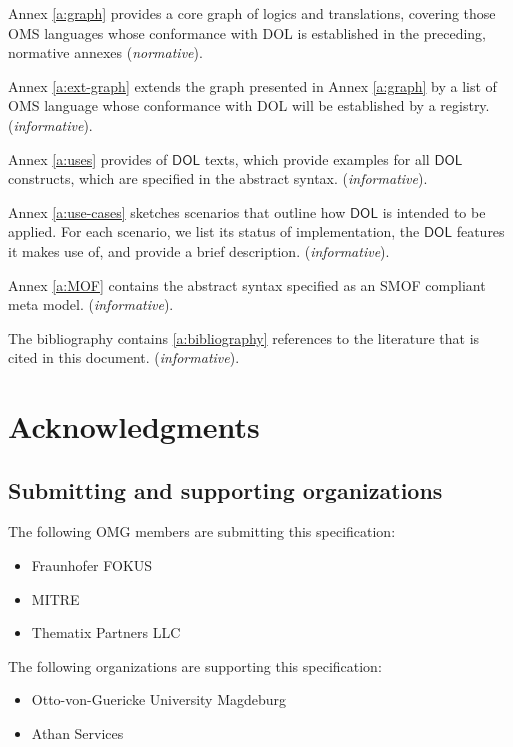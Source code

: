 \documentclass[10pt,fleqn,%
\ifpretendfinal
final%
\else
draft%
\fi,
]{scrreprt}
\newcommand*{\DOL}{\ensuremath{\mathsf{DOL}}\xspace}
\begin{document}
\medskip \noindent 
Annex \ref{a:graph}  provides a core graph of logics and translations, covering those OMS languages
whose conformance with DOL is established in the preceding, normative annexes (\emph{normative}). 

\medskip \noindent 
Annex \ref{a:ext-graph} extends the graph presented in Annex \ref{a:graph}  by a list of OMS
language whose conformance with DOL will be established by a registry.
(\emph{informative}).

\medskip \noindent 
Annex \ref{a:uses} provides of \DOL texts, which provide examples for all \DOL constructs, which 
are specified in the abstract syntax. 
(\emph{informative}).

\medskip \noindent 
Annex \ref{a:use-cases} sketches scenarios that outline how \DOL is intended to be applied. For 
each scenario, we list its status of implementation, the \DOL features it makes use of, and 
provide a brief description.
(\emph{informative}).

\medskip \noindent 
Annex \ref{a:MOF} contains the abstract syntax specified as an SMOF compliant meta model.
(\emph{informative}).


\medskip \noindent 
The bibliography contains \ref{a:bibliography} references to the literature that is cited in this document.
(\emph{informative}).





\section{Acknowledgments}
\subsection{Submitting and supporting organizations}
The following  OMG  members are submitting this specification:
	\begin{itemize}
		\item Fraunhofer FOKUS
		\item MITRE		
		\item Thematix Partners LLC
	\end{itemize}
The following organizations are supporting this specification: 
	\begin{itemize}
		\item Otto-von-Guericke University Magdeburg 
		\item Athan Services 
	\end{itemize}
\end{document}
